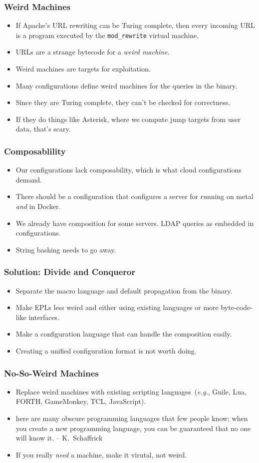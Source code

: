 \documentclass{beamer}
\begin{document}
\begin{frame}\frametitle{Weird Machines}
\begin{itemize}
\item If Apache's URL rewriting can be Turing complete, then every incoming URL is a program executed by the \texttt{mod\_rewrite} virtual machine.
\item URLs are a strange bytecode for a \emph{weird machine}.
\item Weird machines are targets for exploitation.
\item Many configurations define weird machines for the queries in the binary.
\item Since they are Turing complete, they can't be checked for correctness.
\item If they do things like Asterisk, where we compute jump targets from user data, that's scary.
\end{itemize}
\end{frame}

\begin{frame}\frametitle{Composablility}
\begin{itemize}
\item Our configurations lack composability, which is what cloud configurations demand.
\item There should be a configuration that configures a server for running on metal \emph{and} in Docker.
\item We already have composition for some servers. LDAP queries as embedded in configurations.
\item String bashing needs to go away.
\end{itemize}
\end{frame}

\begin{frame}\frametitle{Solution: Divide and Conqueror}
\begin{itemize}
\item Separate the macro language and default propagation from the binary.
\item Make EPLs less weird and either using existing languages or more byte-code-like interfaces.
\item Make a configuration language that can handle the composition easily.
\item Creating a unified configuration format is not worth doing.
\end{itemize}
\end{frame}

\begin{frame}\frametitle{No-So-Weird Machines}
\begin{itemize}
\item Replace weird machines with existing scripting languages~(\emph{e.g.}, Guile, Lua, FORTH, GameMonkey, TCL, JavaScript).
\item here are many obscure programming languages that few people know; when you create a new programming language, you can be guaranteed that no one will know it. -- K.~Schaffrick
\item If you really \emph{need} a machine, make it virutal, not weird.
\end{itemize}
\end{frame}
\end{document}
